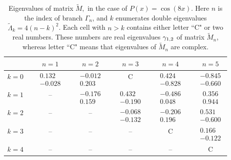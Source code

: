 \documentclass[aps,preprint,showkeys,
]{revtex4}
\begin{document}
\begin{table}[tbp]
\begin{tabular}{ccccccccccc}
& \phantom{111} & $n=1$ &  & $n=2$ &  & $n=3$ &  & $n=4$ &  & $n=5$ \\ \hline
$k=0$ &  & $%
\begin{array}{c}
0.132 \\
-0.028%
\end{array}%
$ &  & $%
\begin{array}{c}
-0.012 \\
0.203%
\end{array}%
$ &  & C &  & $%
\begin{array}{c}
0.424 \\
-0.828%
\end{array}%
$ &  & $%
\begin{array}{c}
-0.845 \\
-0.660%
\end{array}%
$ \\ \hline
$k=1$ &  & -- &  & $%
\begin{array}{c}
-0.176 \\
0.159%
\end{array}%
$ &  & $%
\begin{array}{c}
0.432 \\
-0.190%
\end{array}%
$ &  & $%
\begin{array}{c}
-0.486 \\
0.048%
\end{array}%
$ &  & $%
\begin{array}{c}
0.356 \\
0.944%
\end{array}%
$ \\ \hline
$k=2$ &  & -- &  & -- &  & $%
\begin{array}{c}
-0.068 \\
-0.132%
\end{array}%
$ &  & $%
\begin{array}{c}
-0.206 \\
0.196%
\end{array}%
$ &  & $%
\begin{array}{c}
0.531 \\
-0.600%
\end{array}%
$ \\ \hline
$k=3$ &  & -- &  & -- &  & -- &  & C &  & $%
\begin{array}{c}
0.166 \\
-0.122%
\end{array}%
$ \\ \hline
$k=4$ &  & -- &  & -- &  & -- &  & -- &  & C \\ \hline
\end{tabular}%
\caption{Eigenvalues of matrix $\tilde{M}$,\ in the case of $P(x)=\cos
\left( 8x\right) $. Here $n$ is the index of branch $\Gamma _{n}$, and $k$
enumerates double eigenvalues $\tilde{\Lambda}_{k}=4(n-k)^{2}$. Each cell
with $n>k$ contains either letter ``C" or
two real numbers. These numbers are real eigenvalues $\protect\gamma _{1,2}$
of matrix $\tilde{M}_{n}$, whereas letter ``C" means that eigenvalues 
of $\tilde{M}_{n}$ are complex.}
\label{T4}
\end{table}
\end{document}
